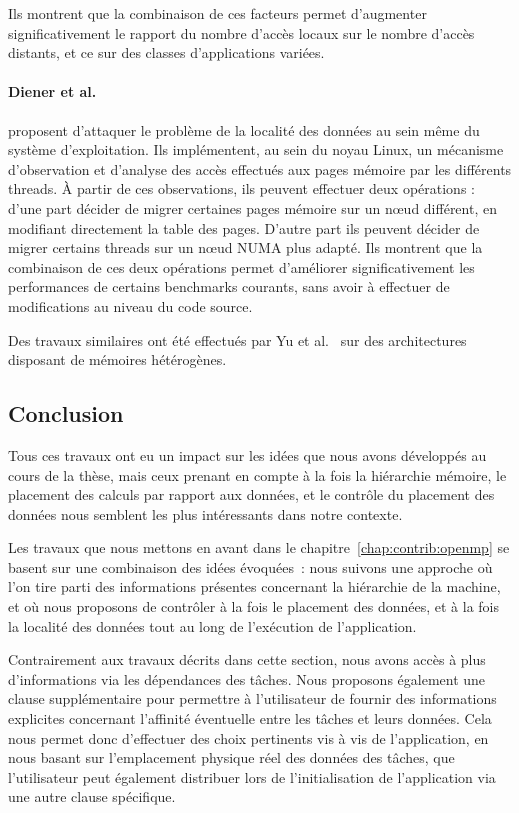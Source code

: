Ils montrent que la combinaison de ces facteurs permet d'augmenter significativement le rapport du nombre d'accès locaux sur le nombre d'accès distants, et ce sur des classes d'applications variées.




\paragraph{Diener et al.~\cite{Diener2014}} proposent d'attaquer le problème de la localité des données au sein même du système d'exploitation.
Ils implémentent, au sein du noyau Linux, un mécanisme d'observation et d'analyse des accès effectués aux pages mémoire par les différents threads.
À partir de ces observations, ils peuvent effectuer deux opérations : d'une part décider de migrer certaines pages mémoire sur un nœud différent, en modifiant directement la table des pages.
D'autre part ils peuvent décider de migrer certains threads sur un nœud NUMA plus adapté.
Ils montrent que la combinaison de ces deux opérations permet d'améliorer significativement les performances de certains benchmarks courants, sans avoir à effectuer de modifications au niveau du code source.

Des travaux similaires ont été effectués par Yu et al.~\cite{Yu2017} sur des architectures disposant de mémoires hétérogènes.



\subsection*{Conclusion}

Tous ces travaux ont eu un impact sur les idées que nous avons développés au cours de la thèse, mais ceux prenant en compte à la fois la hiérarchie mémoire, le placement des calculs par rapport aux données, et le contrôle du placement des données nous semblent les plus intéressants dans notre contexte.

Les travaux que nous mettons en avant dans le chapitre~\ref{chap:contrib:openmp} se basent sur une combinaison des idées évoquées~: nous suivons une approche où l'on tire parti des informations présentes concernant la hiérarchie de la machine, et où nous proposons de contrôler à la fois le placement des données, et à la fois la localité des données tout au long de l'exécution de l'application.

Contrairement aux travaux décrits dans cette section, nous avons accès à plus d'informations via les dépendances des tâches. Nous proposons également une clause supplémentaire pour permettre à l'utilisateur de fournir des informations explicites concernant l'affinité éventuelle entre les tâches et leurs données.
Cela nous permet donc d'effectuer des choix pertinents vis à vis de l'application, en nous basant sur l'emplacement physique réel des données des tâches, que l'utilisateur peut également distribuer lors de l'initialisation de l'application via une autre clause spécifique.
